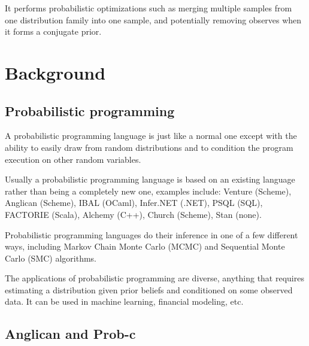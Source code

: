 \documentclass[a4paper]{article}
\begin{document}
It performs probabilistic optimizations such as merging multiple samples from one distribution family into one sample, and potentially removing observes when it forms a conjugate prior.




\section{Background}

\subsection{Probabilistic programming}

A probabilistic programming language is just like a normal one except with the ability to easily draw from random distributions and to condition the program execution on other random variables.

Usually a probabilistic programming language is based on an existing language rather than being a completely new one, examples include: Venture (Scheme), Anglican (Scheme), IBAL (OCaml), Infer.NET (.NET), PSQL (SQL), FACTORIE (Scala), Alchemy (C++), Church (Scheme), Stan (none).

Probabilistic programming languages do their inference in one of a few different ways, including Markov Chain Monte Carlo (MCMC) and Sequential Monte Carlo (SMC) algorithms.

The applications of probabilistic programming are diverse, anything that requires estimating a distribution given prior beliefs and conditioned on some observed data. It can be used in machine learning, financial modeling, etc.



\subsection{Anglican and Prob-c}
\end{document}
